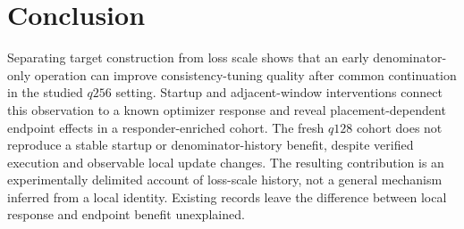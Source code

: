 \section{Conclusion}
Separating target construction from loss scale shows that an early denominator-only operation can improve consistency-tuning quality after common continuation in the studied $q256$ setting. Startup and adjacent-window interventions connect this observation to a known optimizer response and reveal placement-dependent endpoint effects in a responder-enriched cohort. The fresh $q128$ cohort does not reproduce a stable startup or denominator-history benefit, despite verified execution and observable local update changes. The resulting contribution is an experimentally delimited account of loss-scale history, not a general mechanism inferred from a local identity. Existing records leave the difference between local response and endpoint benefit unexplained.
